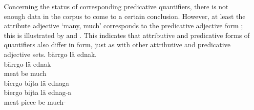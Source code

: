 Concerning the status of corresponding predicative quantifiers, there is not enough data in the corpus to come to a certain conclusion. However, at least the attribute adjective  ‘many, much’ corresponds to the predicative adjective form ; 
this is illustrated by  and . This indicates that attributive and predicative forms of quantifiers also differ in form, just as with other attributive and predicative adjective sets. 
\ea\label{quantifierEx4a}
\glll	bärrgo lä ednak.\\
	bärrgo lä ednak\\
	meat\BS{} be\BS{} much\BS{}\\
{}	
\z
\ea\label{quantifierEx4b}
\glll	biergo bijta lä ednaga\\
	biergo bijta lä ednag-a\\
	meat\BS{} piece\BS{} be\BS{} much-\\
{}	
\z



